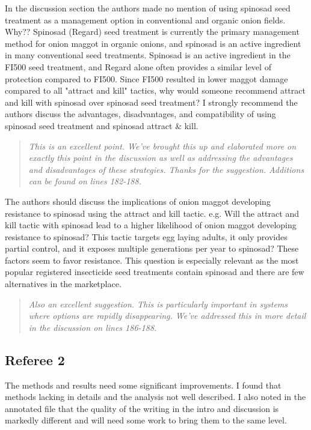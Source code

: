 \documentclass{article}
\begin{document}
In the discussion section the authors made no mention of using spinosad seed treatment as a management option in conventional and organic onion fields.  Why?? Spinosad (Regard) seed treatment is currently the primary management method for onion maggot in organic onions, and spinosad is an active ingredient in many conventional seed treatments.   Spinosad is an active ingredient in the FI500 seed treatment, and Regard alone often provides a similar level of protection compared to FI500.  Since FI500 resulted in lower maggot damage compared to all "attract and kill" tactics, why would someone recommend attract and kill with spinosad over spinosad seed treatment?   I strongly recommend the authors discuss the advantages, disadvantages, and compatibility of using spinosad seed treatment and spinosad attract & kill.    

\begin{quote}
    \textit{This is an excellent point.  We've brought this up and elaborated more on exactly this point in the discussion as well as addressing the advantages and disadvantages of these strategies.  Thanks for the suggestion.  Additions can be found on lines 182-188.
    }
\end{quote}

The authors should discuss the implications of onion maggot developing resistance to spinosad using the attract and kill tactic.  e.g. Will the attract and kill tactic with spinosad lead to a higher likelihood of onion maggot developing resistance to spinosad?  This tactic targets egg laying adults, it only provides partial control, and it exposes multiple generations per year to spinosad?   These factors seem to favor resistance. This question is especially relevant as the most popular registered insecticide seed treatments contain spinosad and there are few alternatives in the marketplace.     

\begin{quote}
    \textit{Also an excellent suggestion.  This is particularly important in systems where options are rapidly disappearing.  We've addressed this in more detail in the discussion on lines 186-188.  
    }
\end{quote}

\subsection*{Referee 2}

The methods and results need some significant improvements. I found that methods lacking in details and the analysis not well described. I also noted in the annotated file that the quality of the writing in the intro and discussion is markedly different and will need some work to bring them to the same level.
\end{document}
